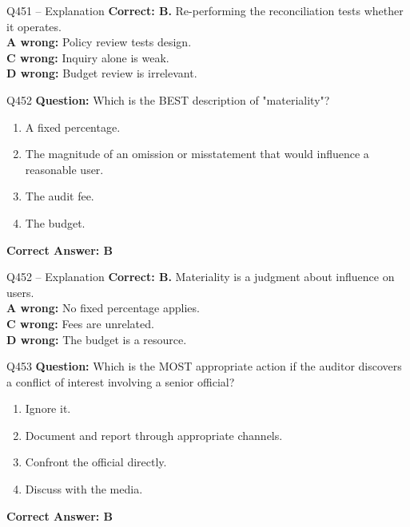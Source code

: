 \documentclass[aspectratio=169,10pt]{beamer}
\begin{document}
	\begin{frame}[t]{Q451 -- Explanation}
		\small
		\textbf{Correct: B.} Re-performing the reconciliation tests whether it operates. \\[4pt]
		\textbf{A wrong:} Policy review tests design. \\[2pt]
		\textbf{C wrong:} Inquiry alone is weak. \\[2pt]
		\textbf{D wrong:} Budget review is irrelevant.
	\end{frame}
	
	\begin{frame}[t]{Q452}
		\small
		\textbf{Question:} Which is the BEST description of "materiality"?
		\begin{enumerate}[label=\Alph*.,itemsep=1pt,topsep=2pt]
			\item A fixed percentage.
			\item The magnitude of an omission or misstatement that would influence a reasonable user.
			\item The audit fee.
			\item The budget.
		\end{enumerate}
		\vspace{4pt}
		\textbf{Correct Answer: B}
	\end{frame}
	
	\begin{frame}[t]{Q452 -- Explanation}
		\small
		\textbf{Correct: B.} Materiality is a judgment about influence on users. \\[4pt]
		\textbf{A wrong:} No fixed percentage applies. \\[2pt]
		\textbf{C wrong:} Fees are unrelated. \\[2pt]
		\textbf{D wrong:} The budget is a resource.
	\end{frame}
	
	\begin{frame}[t]{Q453}
		\small
		\textbf{Question:} Which is the MOST appropriate action if the auditor discovers a conflict of interest involving a senior official?
		\begin{enumerate}[label=\Alph*.,itemsep=1pt,topsep=2pt]
			\item Ignore it.
			\item Document and report through appropriate channels.
			\item Confront the official directly.
			\item Discuss with the media.
		\end{enumerate}
		\vspace{4pt}
		\textbf{Correct Answer: B}
	\end{frame}
	
\end{document}
